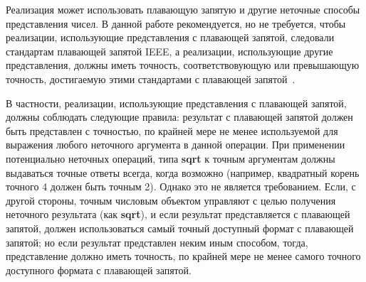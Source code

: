Реализация может использовать плавающую запятую и другие неточные способы представления
 чисел. В данной работе рекомендуется, но не требуется, чтобы реализации,
использующие представления с плавающей запятой, следовали стандартам плавающей запятой IEEE, а
реализации, использующие другие представления, должны иметь точность, соответствовующую или
превышающую точность, достигаемую этими стандартами с плавающей запятой~\cite{IEEE}.

В частности, реализации, использующие представления с плавающей запятой, должны соблюдать
следующие правила: результат с плавающей запятой должен быть представлен с точностью, по крайней
мере не менее используемой для выражения любого неточного аргумента в данной операции. При
применении потенциально неточных операций, типа {\cf\bfseries sqrt} к точным аргументам должны
выдаваться точные ответы всегда, когда возможно (например, квадратный корень точного 4 должен
быть точным 2). Однако это не является требованием. Если, с другой стороны, точным числовым
объектом управляют с целью получения неточного результата (как {\cf\bfseries sqrt}), и если
результат представляется с плавающей запятой, должен использоваться самый точный доступный
формат с плавающей запятой; но если результат представлен неким иным способом, тогда,
представление должно иметь точность, по крайней мере не менее самого точного доступного формата с
плавающей запятой.

